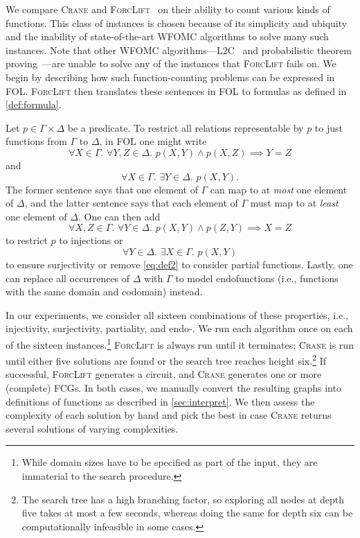 \documentclass{article}
\theoremstyle{definition}
\begin{document}
We compare \textsc{Crane} and
\textsc{ForcLift}~\cite{DBLP:conf/ijcai/BroeckTMDR11} on their ability to count
various kinds of functions. This class of instances is chosen because of its
simplicity and ubiquity and the inability of state-of-the-art WFOMC algorithms
to solve many such instances. Note that other WFOMC
algorithms---\textsc{L2C}~\cite{DBLP:conf/kr/KazemiP16} and probabilistic
theorem proving~\cite{DBLP:journals/cacm/GogateD16}---are unable to solve any of
the instances that \textsc{ForcLift} fails on. We begin by describing how such
function-counting problems can be expressed in FOL\@. \textsc{ForcLift} then
translates these sentences in FOL to formulas as defined in \cref{def:formula}.

Let $p \in \Gamma \times \Delta$ be a predicate. To restrict all relations
representable by $p$ to just functions from $\Gamma$ to $\Delta$, in FOL one
might write
\[
  \forall X \in \Gamma\text{. }\forall Y,Z \in \Delta\text{. }p(X, Y) \land p(X, Z) \implies Y = Z
\]
and
\begin{equation}\label{eq:def2}
  \forall X \in \Gamma\text{. }\exists Y \in \Delta\text{. }p(X, Y).
\end{equation}
The former sentence says that one element of $\Gamma$ can map to at \emph{most}
one element of $\Delta$, and the latter sentence says that each element of
$\Gamma$ must map to at \emph{least} one element of $\Delta$. One can then add
\[
  \forall X,Z \in \Gamma\text{. }\forall Y \in \Delta\text{. }p(X, Y) \land p(Z, Y) \implies X = Z
\]
to restrict $p$ to injections or
\[
  \forall Y \in \Delta\text{. }\exists X \in \Gamma\text{. }p(X, Y)
\]
to ensure surjectivity or remove \cref{eq:def2} to consider partial functions.
Lastly, one can replace all occurrences of $\Delta$ with $\Gamma$ to model
endofunctions (i.e., functions with the same domain and codomain) instead.

In our experiments, we consider all sixteen combinations of these properties,
i.e., injectivity, surjectivity, partiality, and endo-. We run each algorithm
once on each of the sixteen instances.\footnote{While domain sizes have to be
  specified as part of the input, they are immaterial to the search procedure.}
\textsc{ForcLift} is always run until it terminates; \textsc{Crane} is run until
either five solutions are found or the search tree reaches height
six.\footnote{The search tree has a high branching factor, so exploring all
  nodes at depth five takes at most a few seconds, whereas doing the same for
  depth six can be computationally infeasible in some cases.} If successful,
\textsc{ForcLift} generates a circuit, and \textsc{Crane} generates one or more
(complete) FCGs. In both cases, we manually convert the resulting graphs into
definitions of functions as described in \cref{sec:interpret}. We then assess
the complexity of each solution by hand and pick the best in case \textsc{Crane}
returns several solutions of varying complexities.
\end{document}
